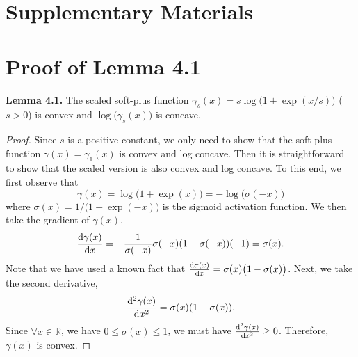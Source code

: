 \documentclass{article}
\begin{document}
\section*{Supplementary Materials}%

\section{Proof of Lemma 4.1}
\noindent \textbf{Lemma 4.1.} The scaled soft-plus function $\gamma_s(x) = s\log\big(1+\exp({x}/{s})\big)$ ($s>0$) is convex and $\log\big(\gamma_s(x)\big)$ is concave. 

\begin{proof}
Since $s$ is a positive constant, we only need to show that the soft-plus function $\gamma(x) = \gamma_1(x)$ is convex and log concave. Then it is straightforward to show that the scaled version is also convex and log concave.  To this end, we first observe that 
\[
\gamma(x) = \log\big(1+\exp(x)\big) = -\log\big(\sigma(-x)\big)
\]
where $\sigma(x) = 1/\big(1+\exp(-x)\big)$ is the sigmoid activation function. We then take the gradient of $\gamma(x)$, 
\begin{align}
\frac{{\rm d} \gamma(x)}{{\rm d} x} = -\frac{1}{\sigma(-x)} \sigma(-x)(1-\sigma(-x))(-1) = \sigma(x). \label{eq:grad}
\end{align}
Note that we have used a known fact that $\frac{{\rm d} \sigma(x)}{{\rm d} x} = \sigma(x)\big(1-\sigma(x)\big)$. Next, we take the second derivative, 
\[
\frac{{\rm d}^2 \gamma(x)}{{\rm d} x^2} = \sigma(x)(1-\sigma(x)).
\]
Since $\forall x \in \mathbb{R}$, we have $0\le \sigma(x) \le 1$, we must have $\frac{{\rm d}^2 \gamma(x)}{{\rm d} x^2} \ge 0$. Therefore, $\gamma(x)$ is convex. 


\end{proof}
\end{document}
